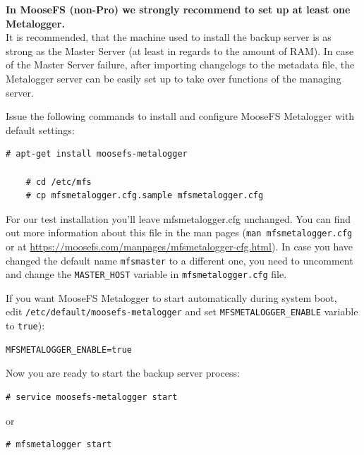 \documentclass[a4paper,11pt,english]{report}
\def\code#1{\texttt{#1}}
\begin{document}
			\textbf{In MooseFS (non-Pro) we strongly recommend to set up at least one Metalogger.} \\
			
			It is recommended, that the machine used to install the backup server is as strong as the Master Server (at least in regards to the amount of RAM). In case of the Master Server failure, after importing changelogs to the
			metadata file, the Metalogger server can be easily set up to take over functions of the managing server.
			
			Issue the following commands to install and configure MooseFS Metalogger with default settings:
			
			\begin{lstlisting}[caption={Installing and configuring Metalogger}]
	# apt-get install moosefs-metalogger
		
	# cd /etc/mfs
	# cp mfsmetalogger.cfg.sample mfsmetalogger.cfg
			\end{lstlisting}
			
			For our test installation you'll leave mfsmetalogger.cfg unchanged. You can find out more information about this file in the man pages (\code{man mfsmetalogger.cfg} or at \url{https://moosefs.com/manpages/mfsmetalogger-cfg.html}).
			In case you have changed the default name \code{mfsmaster} to a different one, you need to uncomment and change the \code{MASTER\_HOST} variable in \code{mfsmetalogger.cfg} file.
			
			If you want MooseFS Metalogger to start automatically during system boot, \\
			edit \code{/etc/default/moosefs-metalogger} and set \code{MFSMETALOGGER\_ENABLE} variable to \code{true}):
			
			\begin{lstlisting}[caption={Configuring mfsmetalogger autostart}]
	MFSMETALOGGER_ENABLE=true
			\end{lstlisting}
			
			Now you are ready to start the backup server process:
			
			\begin{lstlisting}[caption={Starting MooseFS Metalogger}]
	# service moosefs-metalogger start
			\end{lstlisting}
			
			or
			
			\begin{lstlisting}[caption={Starting MooseFS Metalogger}]
	# mfsmetalogger start
			\end{lstlisting}
			
\end{document}
